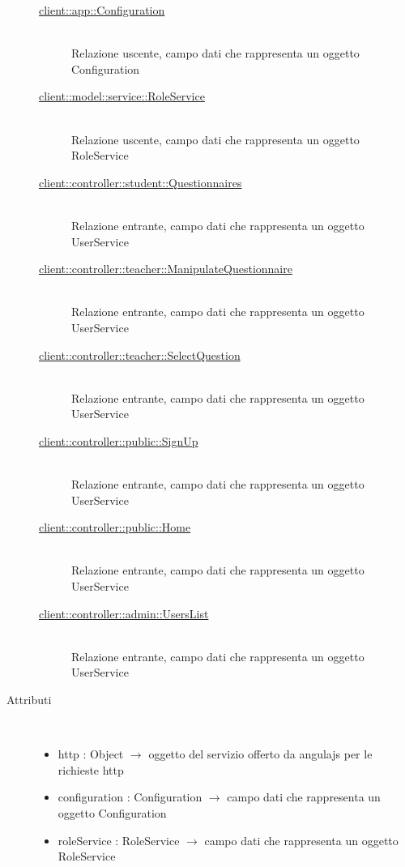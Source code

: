 \begin{description}
\begin{description}
	\item[\hyperlink{client::app::Configuration}{client::app::Configuration}] \hfill \\
	Relazione uscente, campo dati che rappresenta un oggetto Configuration
	\item[\hyperlink{client::model::service::RoleService}{client::model::service::RoleService}] \hfill \\
	Relazione uscente, campo dati che rappresenta un oggetto RoleService
	\item[\hyperlink{client::controller::student::Questionnaires}{client::controller::student::Questionnaires}] \hfill \\
	Relazione entrante, campo dati che rappresenta un oggetto UserService
	\item[\hyperlink{client::controller::teacher::ManipulateQuestionnaire}{client::controller::teacher::ManipulateQuestionnaire}] \hfill \\
	Relazione entrante, campo dati che rappresenta un oggetto UserService
	\item[\hyperlink{client::controller::teacher::SelectQuestion}{client::controller::teacher::SelectQuestion}] \hfill \\
	Relazione entrante, campo dati che rappresenta un oggetto UserService
	\item[\hyperlink{client::controller::public::SignUp}{client::controller::public::SignUp}] \hfill \\
	Relazione entrante, campo dati che rappresenta un oggetto UserService
	\item[\hyperlink{client::controller::public::Home}{client::controller::public::Home}] \hfill \\
	Relazione entrante, campo dati che rappresenta un oggetto UserService
	\item[\hyperlink{client::controller::admin::UsersList}{client::controller::admin::UsersList}] \hfill \\
	Relazione entrante, campo dati che rappresenta un oggetto UserService
\end{description}

\item[Attributi] \hfill \\
\vspace{-7mm}
\begin{itemize}
	\item http : Object $\rightarrow$ oggetto del servizio offerto da angulajs per le richieste http
	\item configuration : Configuration $\rightarrow$ campo dati che rappresenta un oggetto Configuration
	\item roleService : RoleService $\rightarrow$ campo dati che rappresenta un oggetto RoleService
\end{itemize}


\end{description}
